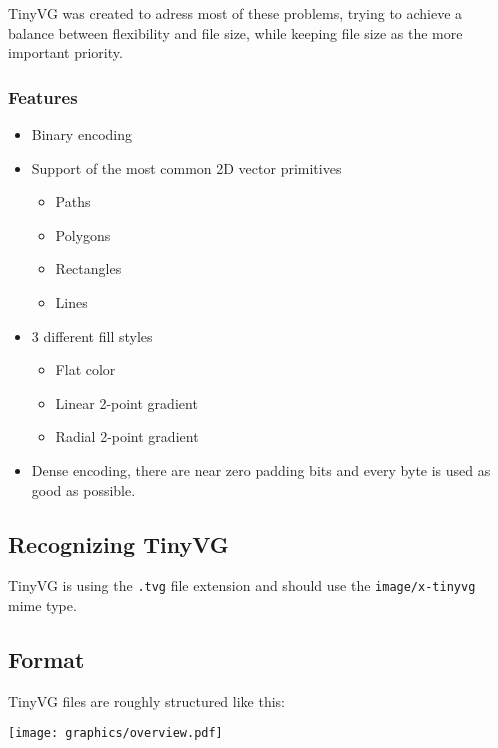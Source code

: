 \documentclass[]{article}
\providecommand{\tightlist}{%
  \setlength{\itemsep}{0pt}\setlength{\parskip}{0pt}}
\begin{document}
TinyVG was created to adress most of these problems, trying to achieve a
balance between flexibility and file size, while keeping file size as
the more important priority.

\hypertarget{features}{%
\subsubsection{Features}\label{features}}

\begin{itemize}
\tightlist
\item
  Binary encoding
\item
  Support of the most common 2D vector primitives

  \begin{itemize}
  \tightlist
  \item
    Paths
  \item
    Polygons
  \item
    Rectangles
  \item
    Lines
  \end{itemize}
\item
  3 different fill styles

  \begin{itemize}
  \tightlist
  \item
    Flat color
  \item
    Linear 2-point gradient
  \item
    Radial 2-point gradient
  \end{itemize}
\item
  Dense encoding, there are near zero padding bits and every byte is
  used as good as possible.
\end{itemize}

\hypertarget{recognition}{\subsection{Recognizing TinyVG}\label{recognition}}

TinyVG is using the \texttt{.tvg} file extension and should use the \texttt{image/x-tinyvg} mime type.

\hypertarget{format}{\subsection{Format}\label{format}}

TinyVG files are roughly structured like this:

\texttt{[image: graphics/overview.pdf]}
\end{document}
